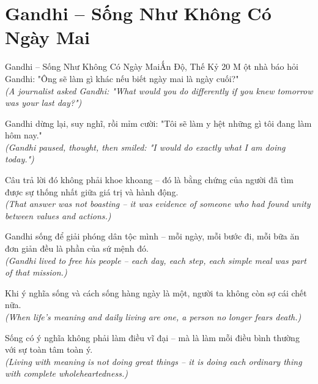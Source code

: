 \section{Gandhi -- Sống Như Không Có Ngày Mai}
\begin{truyen}{Gandhi -- Sống Như Không Có Ngày Mai}{Ấn Độ, Thế Kỷ 20}
M ột nhà báo hỏi Gandhi: "Ông sẽ làm gì khác nếu biết ngày mai là ngày cuối?"\\
\textit{(A journalist asked Gandhi: "What would you do differently if you knew tomorrow was your last day?")}

Gandhi dừng lại, suy nghĩ, rồi mỉm cười: "Tôi sẽ làm y hệt những gì tôi đang làm hôm nay."\\
\textit{(Gandhi paused, thought, then smiled: "I would do exactly what I am doing today.")}

Câu trả lời đó không phải khoe khoang -- đó là bằng chứng của người đã tìm được sự thống nhất giữa giá trị và hành động.\\
\textit{(That answer was not boasting -- it was evidence of someone who had found unity between values and actions.)}

Gandhi sống để giải phóng dân tộc mình -- mỗi ngày, mỗi bước đi, mỗi bữa ăn đơn giản đều là phần của sứ mệnh đó.\\
\textit{(Gandhi lived to free his people -- each day, each step, each simple meal was part of that mission.)}

Khi ý nghĩa sống và cách sống hàng ngày là một, người ta không còn sợ cái chết nữa.\\
\textit{(When life's meaning and daily living are one, a person no longer fears death.)}

\end{truyen}
\begin{baihoc}
  Sống có ý nghĩa không phải làm điều vĩ đại -- mà là làm mỗi điều bình thường với sự toàn tâm toàn ý.\\
  \textit{(Living with meaning is not doing great things -- it is doing each ordinary thing with complete wholeheartedness.)}
\end{baihoc}

